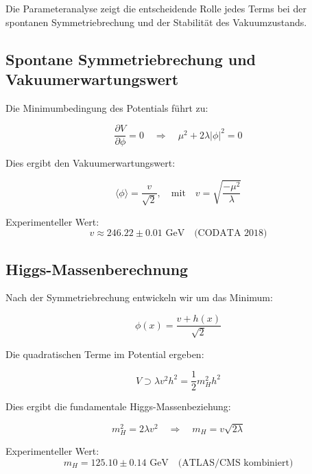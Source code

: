 	Die Parameteranalyse zeigt die entscheidende Rolle jedes Terms bei der spontanen Symmetriebrechung und der Stabilität des Vakuumzustands.
	
	\subsection{Spontane Symmetriebrechung und Vakuumerwartungswert}
	
	Die Minimumbedingung des Potentials führt zu:
	
	\begin{equation}
		\frac{\partial V}{\partial \phi} = 0 \quad \Rightarrow \quad \mu^2 + 2\lambda|\phi|^2 = 0
	\end{equation}
	
	Dies ergibt den Vakuumerwartungswert:
	
	\begin{formel}
		\begin{equation}
			\langle\phi\rangle = \frac{v}{\sqrt{2}}, \quad \text{mit} \quad v = \sqrt{\frac{-\mu^2}{\lambda}}
		\end{equation}
		
		Experimenteller Wert:
		\begin{equation}
			v \approx 246.22 \pm 0.01 \text{ GeV} \quad \text{(CODATA 2018)}
		\end{equation}
	\end{formel}
	
	\subsection{Higgs-Massenberechnung}
	
	Nach der Symmetriebrechung entwickeln wir um das Minimum:
	
	\begin{equation}
		\phi(x) = \frac{v + h(x)}{\sqrt{2}}
	\end{equation}
	
	Die quadratischen Terme im Potential ergeben:
	
	\begin{equation}
		V \supset \lambda v^2 h^2 = \frac{1}{2}m_H^2 h^2
	\end{equation}
	
	Dies ergibt die fundamentale Higgs-Massenbeziehung:
	
	\begin{formel}
		\begin{equation}
			m_H^2 = 2\lambda v^2 \quad \Rightarrow \quad m_H = v\sqrt{2\lambda}
		\end{equation}
		
		Experimenteller Wert:
		\begin{equation}
			m_H = 125.10 \pm 0.14 \text{ GeV} \quad \text{(ATLAS/CMS kombiniert)}
		\end{equation}
	\end{formel}
	
